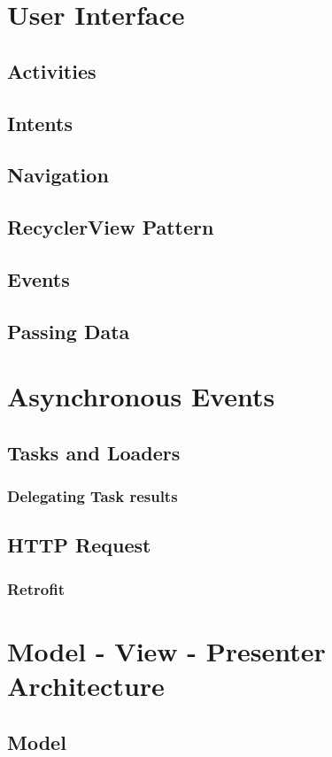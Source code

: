 \section{User Interface}
\subsection{Activities}
\subsection{Intents}
\subsection{Navigation}
\subsection{RecyclerView Pattern}
\subsection{Events}
\subsection{Passing Data}

\section{Asynchronous Events}
\subsection{Tasks and Loaders}
\subsubsection{Delegating Task results}
\subsection{HTTP Request}
\subsubsection{Retrofit}
\section{Model - View - Presenter Architecture}
\subsection{Model}
